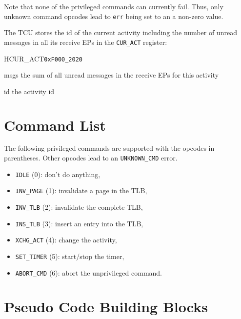 \noindent Note that none of the privileged commands can currently fail. Thus, only unknown command
opcodes lead to \texttt{err} being set to an a non-zero value.

\noindent The TCU stores the id of the current activity including the number of unread messages in all
its receive EPs in the \texttt{CUR\_ACT} register:

\setlength{\regWidth}{.95\textwidth}
\begin{register}{H}{CUR\_ACT}{\texttt{0xF000\_2020}}
  \regnewline%
  \begin{regdesc}\begin{reglist}
    \item[msgs] the sum of all unread messages in the receive EPs for this activity
    \item[id] the activity id
  \end{reglist}\end{regdesc}
\end{register}
\setlength{\regWidth}{\textwidth}
\extend{}

\section{Command List}

The following privileged commands are supported with the opcodes in parentheses. Other opcodes lead
to an \texttt{UNKNOWN\_CMD} error.

\begin{itemize}
  \item \texttt{IDLE} (0):  don't do anything, \extend{}
  \item \texttt{INV\_PAGE} (1): invalidate a page in the TLB, 
  \item \texttt{INV\_TLB} (2): invalidate the complete TLB,
  \item \texttt{INS\_TLB} (3): insert an entry into the TLB, \extend{}
  \item \texttt{XCHG\_ACT} (4): change the activity, 
  \item \texttt{SET\_TIMER} (5): start/stop the timer,
  \item \texttt{ABORT\_CMD} (6): abort the unprivileged command. \extend{}
\end{itemize}

\section{Pseudo Code Building Blocks}

